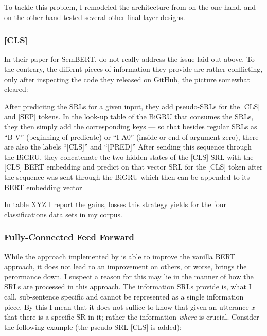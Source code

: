 To tackle this problem, I remodeled the architecture from \cite{zhang2019semantics} on the one
hand, and on the other hand tested several other final layer designs.

\subsubsection{[CLS]}

In their paper for SemBERT, \cite{zhang2019semantics} do not really address the
issue laid out above. To the contrary, the differnt pieces of information they
provide are rather conflicting, only after inspecting the code they released on
\href{https://github.com/cooelf/SemBERT/}{GitHub}, the picture somewhat cleared:

After predicitng the SRLs for a given input, they add pseudo-SRLs for the [CLS] and [SEP] tokens.
In the look-up table of the BiGRU that consumes the SRLs, they then simply add the corresponding
keys --- so that besides regular SRLs as ``B-V'' (beginning of predicate) or ``I-A0'' (inside
or end of argument zero), there are also the labels ``[CLS]'' and ``[PRED]'' After sending this
sequence through the BiGRU, they concatenate the two hidden states of the [CLS] SRL with the
[CLS] BERT embedding and predict on that vector %
SRL for the [CLS] token after the sequence was sent through the BiGRU which then can be appended
to its BERT embedding vector


In table XYZ I report the gains, losses this strategy yields for the four classifications data sets
in my corpus.

\subsubsection{Fully-Connected Feed Forward}

While the approach implemented by \cite{zhang2019semantics} is able to improve the vanilla BERT
approach, it does not lead to an improvement on others, or worse, brings the perormance down. I
suspect a reason for this may lie in the manner of how the SRLs are processed in this approach.
The information SRLs provide is, what I call, sub-sentence specific and cannot be represented
as a single information piece. By this I mean that it does not suffice to know that given an
utterance $x$ that there is a specific SR in it; rather the information \emph{where} is crucial.
Consider the following example (the pseudo SRL [CLS] is added):


